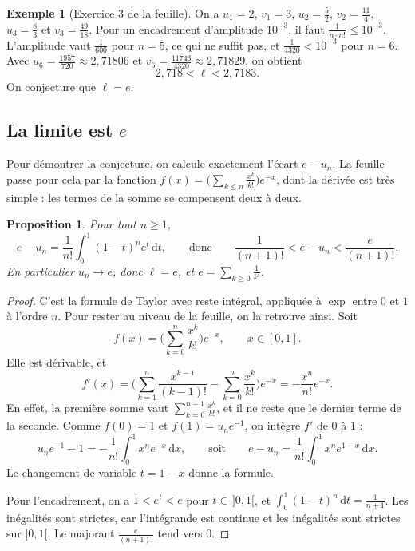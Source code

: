 \documentclass[11pt,a4paper]{article}
\theoremstyle{plain}
\newtheorem{proposition}[theoreme]{Proposition}
\theoremstyle{definition}
\newtheorem{exemple}[theoreme]{Exemple}
\theoremstyle{remark}
\newcommand{\dd}{\,\mathrm{d}}
\begin{document}
\begin{exemple}[Exercice 3 de la feuille]
On a $u_1=2$, $v_1=3$, $u_2=\frac52$, $v_2=\frac{11}4$, $u_3=\frac83$ et $v_3=\frac{49}{18}$. Pour un encadrement d'amplitude $10^{-3}$, il faut $\frac1{n\cdot n!}\leq10^{-3}$. L'amplitude vaut $\frac1{600}$ pour $n=5$, ce qui ne suffit pas, et $\frac1{4320}<10^{-3}$ pour $n=6$. Avec $u_6=\frac{1957}{720}\approx2{,}71806$ et $v_6=\frac{11743}{4320}\approx2{,}71829$, on obtient
\[
  2{,}718<\ell<2{,}7183 .
\]
On conjecture que $\ell=e$.
\end{exemple}

\subsection{La limite est \texorpdfstring{$e$}{e}}

Pour démontrer la conjecture, on calcule exactement l'écart $e-u_n$. La feuille passe pour cela par la fonction $f(x)=\big(\sum_{k\leq n}\frac{x^k}{k!}\big)e^{-x}$, dont la dérivée est très simple : les termes de la somme se compensent deux à deux.

\begin{proposition}\label{prop:reste}
Pour tout $n\geq1$,
\[
  e-u_n=\frac1{n!}\int_0^1(1-t)^ne^t\dd t ,
  \qquad\text{donc}\qquad
  \frac1{(n+1)!}<e-u_n<\frac{e}{(n+1)!} .
\]
En particulier $u_n\to e$, donc $\ell=e$, et $e=\sum_{k\geq0}\frac1{k!}$.
\end{proposition}

\begin{proof}
C'est la formule de Taylor avec reste intégral, appliquée à $\exp$ entre $0$ et $1$ à l'ordre $n$. Pour rester au niveau de la feuille, on la retrouve ainsi. Soit
\[
  f(x)=\Big(\sum_{k=0}^n\frac{x^k}{k!}\Big)e^{-x},\qquad x\in[0,1].
\]
Elle est dérivable, et
\[
  f'(x)=\Big(\sum_{k=1}^n\frac{x^{k-1}}{(k-1)!}-\sum_{k=0}^n\frac{x^k}{k!}\Big)e^{-x}=-\frac{x^n}{n!}e^{-x}.
\]
En effet, la première somme vaut $\sum_{k=0}^{n-1}\frac{x^k}{k!}$, et il ne reste que le dernier terme de la seconde. Comme $f(0)=1$ et $f(1)=u_ne^{-1}$, on intègre $f'$ de $0$ à $1$ :
\[
  u_ne^{-1}-1=-\frac1{n!}\int_0^1x^ne^{-x}\dd x,
  \qquad\text{soit}\qquad
  e-u_n=\frac1{n!}\int_0^1x^ne^{1-x}\dd x .
\]
Le changement de variable $t=1-x$ donne la formule.

Pour l'encadrement, on a $1<e^t<e$ pour $t\in\,]0,1[$, et $\int_0^1(1-t)^n\dd t=\frac1{n+1}$. Les inégalités sont strictes, car l'intégrande est continue et les inégalités sont strictes sur $]0,1[$. Le majorant $\frac e{(n+1)!}$ tend vers $0$.
\end{proof}
\end{document}
